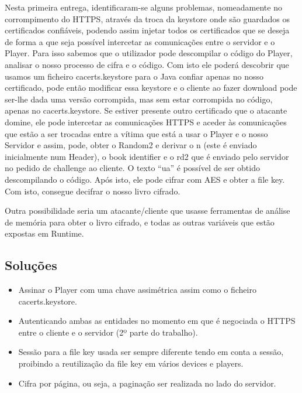 \documentclass[pdftex,12pt,a4paper]{report}
\begin{document}
Nesta primeira entrega, identificaram-se alguns problemas, nomeadamente no corrompimento do HTTPS, através da troca da keystore onde são guardados os certificados confiáveis, podendo assim injetar todos os certificados que se deseja de forma a que seja possível intercetar as comunicações entre o servidor e o Player. Para isso sabemos que o utilizador pode descompilar o código do Player, analisar o nosso processo de cifra e o código. Com isto ele poderá descobrir que usamos um ficheiro cacerts.keystore para o Java confiar apenas no nosso certificado, pode então modificar essa keystore e o cliente ao fazer download pode ser-lhe dada uma versão corrompida, mas sem estar corrompida no código, apenas no cacerts.keystore. Se estiver presente outro certificado que o atacante domine, ele pode intercetar as comunicações HTTPS e aceder às comunicações que estão a ser trocadas entre a vítima que está a usar o Player e o nosso Servidor e assim, pode, obter o Random2 e derivar o n (este é enviado inicialmente num Header), o book identifier e o rd2 que é enviado pelo servidor no pedido de challenge ao cliente. O texto “ua” é possível de ser obtido descompilando o código. Após isto, ele pode cifrar com AES e obter a file key. Com isto, consegue decifrar o nosso livro cifrado.

Outra possibilidade seria um atacante/cliente que usasse ferramentas de análise de memória para obter o livro cifrado, e todas as outras variáveis que estão expostas em Runtime.

\subsection{Soluções}

\begin{itemize}
\item Assinar o Player com uma chave assimétrica assim como o ficheiro cacerts.keystore.
\item Autenticando ambas as entidades no momento em que é negociada o HTTPS entre o cliente e o servidor (2º parte do trabalho).
\item Sessão para a file key usada ser sempre diferente tendo em conta a sessão, proibindo a reutilização da file key em vários devices e players.
\item Cifra por página, ou seja, a paginação ser realizada no lado do servidor.
\end{itemize}
\end{document}
